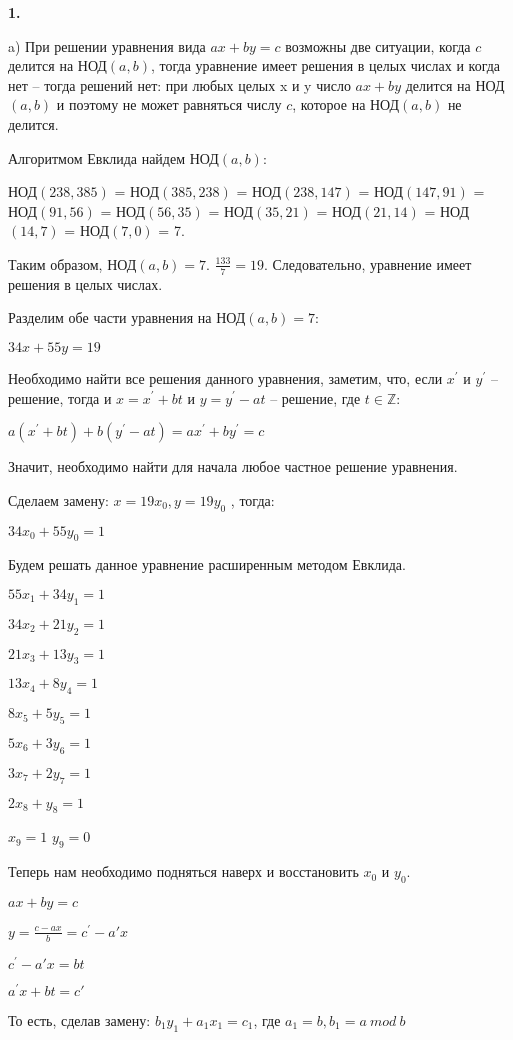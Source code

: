 \documentclass[12pt]{extreport}
\begin{document}
{\bf 1.} 

a) При решении уравнения вида $ax+by=c$ возможны две ситуации, когда $c$ делится на НОД$(a,b)$, тогда уравнение имеет решения в целых числах и когда нет -- тогда решений нет: при любых целых x и y число $ax + by$ делится на НОД$(a,b)$ и поэтому не может равняться числу $c$, которое на НОД$(a,b)$ не делится.

Алгоритмом Евклида найдем НОД$(a,b)$:

НОД$(238,385)$ = НОД$(385, 238)$ = НОД$(238,147)$ = НОД$(147,91)$ = НОД$(91,56)$ = НОД$(56,35)$ = НОД$(35,21)$ = НОД$(21,14)$ = НОД$(14,7)$ = НОД$(7,0)$ = 7.

Таким образом, НОД$(a,b) =7$. $\frac{133}{ 7}= 19$. Следовательно, уравнение имеет решения в целых числах.

Разделим обе части уравнения на НОД$(a,b) =7$:

$34x+55y=19$

Необходимо найти все решения данного уравнения, заметим, что, если $x^{'}$ и $y^{'}$ -- решение, тогда и $x = x^{'}+bt$ и $y = y^{'} - at$ -- решение, где $t \in \mathbb{Z}$:

$a(x^{'}+bt) + b(y^{'} - at) = ax^{'} + by^{'} = c$

Значит, необходимо найти для начала любое частное решение уравнения. 

Сделаем замену: $x = 19 x_0, y = 19 y_0$ , тогда:

$34x_0 + 55y_0=1$

Будем решать данное уравнение расширенным методом Евклида. 

$55x_1 + 34y_1=1$

$34x_2 + 21y_2=1$

$21x_3 + 13y_3=1$

$13x_4 + 8y_4=1$

$8x_5 + 5y_5=1$

$5x_6 + 3y_6=1$

$3x_7 + 2y_7=1$

$2x_8 + y_8=1$

$x_9=1$ $y_9=0$

Теперь нам необходимо подняться наверх и восстановить $x_0$ и $y_0$.

$ax+by=c$

$y = \frac{c-ax}{b} = c^{'}-a{'}x$

$c^{'}-a{'}x =bt$

$a^{'}x + bt = c{'}$

То есть, сделав замену: $b_1y_1+a_1x_1=c_1$, где $a_1=b, b_1=a \:mod \:b$
\end{document}
